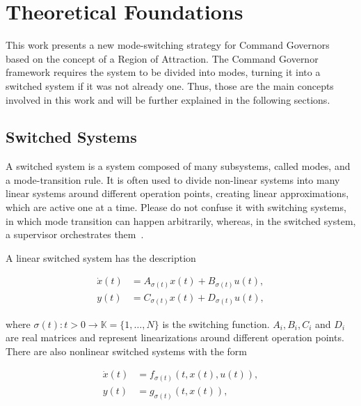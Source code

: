 
\chapter{Theoretical Foundations}%
\label{chp:theoretical-foundations}

This work presents a new mode-switching strategy for Command Governors based on
the concept of a Region of Attraction. The Command Governor framework requires
the system to be divided into modes, turning it into a switched system if it was
not already one. Thus, those are the main concepts involved in this work and
will be further explained in the following sections.

\section{Switched Systems}%
\label{sec:switched-systems}


A switched system is a system composed of many subsystems, called modes, and a
mode-transition rule. It is often used to divide non-linear systems into many
linear systems around different operation points, creating linear
approximations, which are active one at a time. Please do not confuse it with
switching systems, in which mode transition can happen arbitrarily, whereas, in
the switched system, a supervisor orchestrates
them~\parencite{lucia.franzè:stabilization,liberzon.morse:basic}.

A linear switched system has the description

\begin{align}
	\dot{x}(t) & = A_{\sigma(t)}x(t) + B_{\sigma(t)}u(t), \\
	y(t)       & = C_{\sigma(t)}x(t) + D_{\sigma(t)}u(t),
\end{align}

where \(\sigma(t):t>0\rightarrow\mathbb{K}=\{1,\ldots,N\}\) is the switching function.
\(A_{i}, B_{i}, C_{i}\) and \(D_{i}\) are real matrices and represent
linearizations around different operation points. There are also nonlinear
switched systems with the form

\begin{align}
	\dot{x}(t) & = f_{\sigma(t)}(t,x(t),u(t)), \\
	y(t)       & = g_{\sigma(t)}(t,x(t)),
\end{align}


